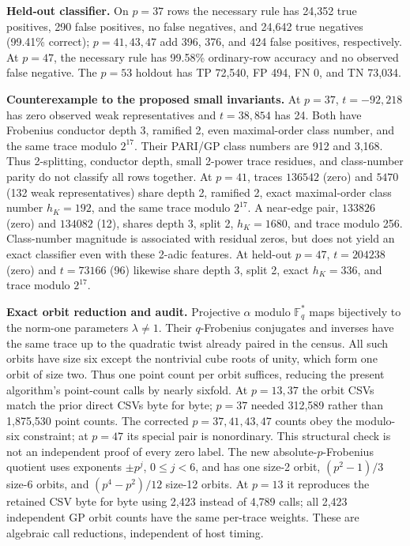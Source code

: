 \documentclass[10pt]{extarticle}
\begin{document}
\medskip
\noindent\textbf{Held-out classifier.} On $p=37$ rows the necessary rule
has 24,352 true positives, 290 false positives, no false negatives,
and 24,642 true negatives (99.41\% correct); $p=41,43,47$ add 396,
376, and 424 false positives, respectively. At $p=47$, the necessary
rule has 99.58\% ordinary-row accuracy and no observed false negative.
The $p=53$ holdout has TP 72,540, FP 494, FN 0, and TN 73,034.

\noindent\textbf{Counterexample to the proposed small invariants.}
At $p=37$, $t=-92{,}218$ has zero observed weak representatives and
$t=38{,}854$ has 24. Both have Frobenius conductor depth 3,
ramified 2, even maximal-order class number, and the same trace
modulo $2^{17}$. Their PARI/GP class numbers are 912 and 3,168.
Thus 2-splitting, conductor depth, small 2-power trace residues,
and class-number parity do not classify all rows together.
At $p=41$, traces $136542$ (zero) and $5470$ (132 weak representatives)
share depth 2, ramified 2, exact maximal-order class number $h_K=192$,
and the same trace modulo $2^{17}$. A near-edge pair, $133826$ (zero)
and $134082$ (12), shares depth 3, split 2, $h_K=1680$, and trace
modulo 256. Class-number magnitude is associated with residual zeros,
but does not yield an exact classifier even with these 2-adic features.
At held-out $p=47$, $t=204238$ (zero) and $t=73166$ (96) likewise share
depth 3, split 2, exact $h_K=336$, and trace modulo $2^{17}$.

\noindent\textbf{Exact orbit reduction and audit.} Projective $\alpha$
modulo $\mathbb F_q^*$ maps bijectively to the norm-one parameters
$\lambda\ne1$. Their $q$-Frobenius conjugates and inverses have the same
trace up to the quadratic twist already paired in the census. All such
orbits have size six except the nontrivial cube roots of unity, which
form one orbit of size two. Thus one point count per orbit suffices,
reducing the present algorithm's point-count calls by nearly sixfold.
At $p=13,37$ the orbit CSVs match the prior direct CSVs byte for byte;
$p=37$ needed 312,589 rather than 1,875,530 point counts. The corrected
$p=37,41,43,47$ counts obey the modulo-six constraint; at $p=47$ its
special pair is nonordinary. This structural
check is not an independent proof of every zero label.
The new absolute-$p$-Frobenius quotient uses exponents $\pm p^j$,
$0\le j<6$, and has one size-2 orbit, $(p^2-1)/3$ size-6 orbits, and
$(p^4-p^2)/12$ size-12 orbits. At $p=13$ it reproduces the retained CSV
byte for byte using 2,423 instead of 4,789 calls; all 2,423 independent
GP orbit counts have the same per-trace weights. These are algebraic
call reductions, independent of host timing.
\end{document}
